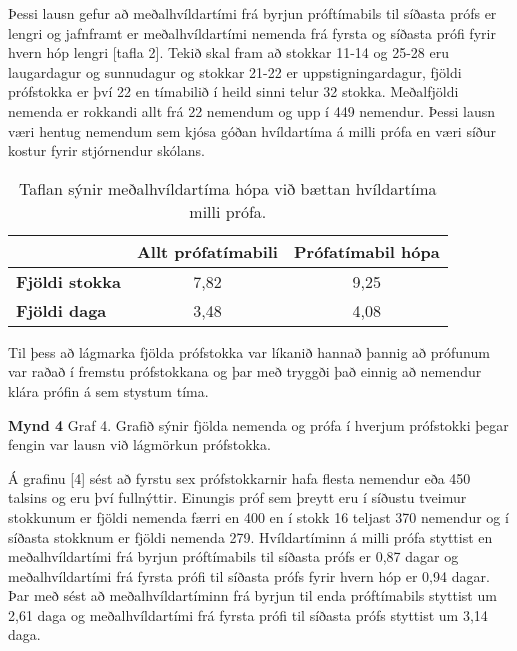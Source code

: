 \documentclass[12pt]{article}
\begin{document}
\bigskip


Þessi lausn gefur að meðalhvíldartími frá byrjun próftímabils til síðasta prófs er lengri og jafnframt er meðalhvíldartími nemenda frá fyrsta og síðasta prófi fyrir hvern hóp lengri [tafla 2]. Tekið skal fram að stokkar 11-14 og 25-28 eru laugardagur og sunnudagur og stokkar 21-22 er uppstigningardagur, fjöldi prófstokka er því 22 en tímabilið í heild sinni telur 32 stokka.
Meðalfjöldi nemenda er rokkandi allt frá 22 nemendum og upp í 449 nemendur. Þessi lausn væri hentug nemendum sem kjósa góðan hvíldartíma á milli prófa en væri síður kostur fyrir stjórnendur skólans.

\bigskip

\begin{table}[h]
	\centering
	\label{my-label}
	\begin{tabular}{l|c|c|}
		\cline{2-3}
		& \multicolumn{1}{l|}{\textbf{Allt prófatímabili}} & \multicolumn{1}{l|}{\textbf{Prófatímabil hópa}} \\ \hline
		\multicolumn{1}{|l|}{\textbf{Fjöldi stokka}} & 7,82                                             & 9,25                                            \\ \hline
		\multicolumn{1}{|l|}{\textbf{Fjöldi daga}}   & 3,48                                             & 4,08                                            \\ \hline
	\end{tabular}
	\caption{Taflan sýnir meðalhvíldartíma hópa við bættan hvíldartíma milli prófa.}
\end{table}

Til þess að lágmarka fjölda prófstokka var líkanið hannað þannig að prófunum var raðað í fremstu prófstokkana og þar með tryggði það einnig að nemendur klára prófin á sem stystum tíma. 


\bigskip

\textbf{Mynd 4}
Graf 4. Grafið sýnir fjölda nemenda og prófa í hverjum prófstokki þegar fengin var lausn við lágmörkun prófstokka.

Á grafinu [4] sést að fyrstu sex prófstokkarnir hafa flesta nemendur eða 450 talsins og eru því fullnýttir. Einungis próf sem þreytt eru í síðustu tveimur stokkunum er fjöldi nemenda færri en 400 en í stokk 16 teljast 370 nemendur og í síðasta stokknum er fjöldi nemenda 279.
Hvíldartíminn á milli prófa styttist en meðalhvíldartími frá byrjun próftímabils til síðasta prófs er 0,87 dagar og meðalhvíldartími frá fyrsta prófi til síðasta prófs fyrir hvern hóp er 0,94 dagar. Þar með sést að meðalhvíldartíminn frá byrjun til enda próftímabils styttist um 2,61 daga og meðalhvíldartími frá fyrsta prófi til síðasta prófs styttist um 3,14 daga. 
\end{document}
